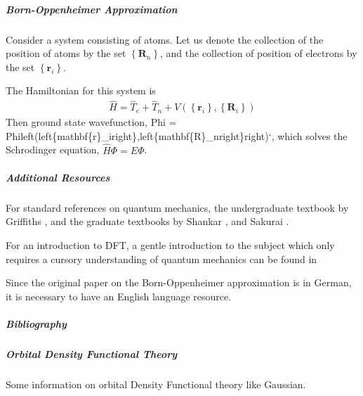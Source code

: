 \documentclass[letterpaper,10pt,english]{sphinxmanual}
\begin{document}
\subparagraph{Born-Oppenheimer Approximation}
\label{\detokenize{dft/dft_intro:born-oppenheimer-approximation}}
Consider a system consisting of atoms.  Let us denote the collection of the position of atoms by the set \(\left\{ \mathbf{R}_n \right\}\), and the collection of position of electrons by the set \(\left\{ \mathbf{r}_i \right\}\).

The Hamiltonian for this system is
\begin{equation*}
\begin{split}\hat{H} = \hat{T}_e + \hat{T}_n + V\left( \left\{ \mathbf{r}_i \right\},
                                          \left\{ \mathbf{R}_i \right\} \right)\end{split}
\end{equation*}
Then ground state wavefunction, Phi = Phileft(left\{mathbf\{r\}\_iright\},left\{mathbf\{R\}\_nright\}right){}`, which solves the Schrodinger equation, \(\hat{H}\Phi=E\Phi\).


\subparagraph{Additional Resources}
\label{\detokenize{dft/dft_intro:additional-resources}}
For standard references on quantum mechanics, the undergraduate textbook by Griffiths \label{\detokenize{dft/dft_intro:id1}}{\hyperref[\detokenize{dft/dft_intro:griffiths1995-book-qm}]{\sphinxcrossref{{[}Gri16{]}}}}, and the graduate textbooks by Shankar \label{\detokenize{dft/dft_intro:id2}}{\hyperref[\detokenize{dft/dft_intro:shankar2012-book-qm}]{\sphinxcrossref{{[}Sha12{]}}}}, and Sakurai \label{\detokenize{dft/dft_intro:id3}}{\hyperref[\detokenize{dft/dft_intro:sakurai2014-book-qm}]{\sphinxcrossref{{[}SN14{]}}}}.

For an introduction to DFT, a gentle introduction to the subject which only requires a cursory understanding of quantum mechanics can be found in  \label{\detokenize{dft/dft_intro:id4}}{\hyperref[\detokenize{dft/dft_intro:capelle2006-dft}]{\sphinxcrossref{{[}Cap06{]}}}}

Since the original paper on the Born-Oppenheimer approximation is in German, it is necessary to have an English language resource.


\subparagraph{Bibliography}
\label{\detokenize{dft/dft_intro:bibliography}}



\subparagraph{Orbital Density Functional Theory}
\label{\detokenize{dft/dft_orbital:orbital-density-functional-theory}}\label{\detokenize{dft/dft_orbital:dft-orbital}}\label{\detokenize{dft/dft_orbital::doc}}
Some information on orbital Density Functional theory like Gaussian.
\end{document}
